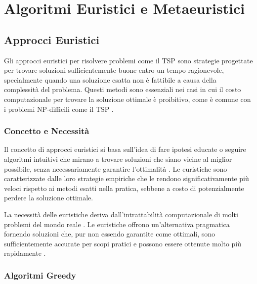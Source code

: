 
%

\chapter{Algoritmi Euristici e Metaeuristici}\label{chapt:4}
\section{Approcci Euristici}

Gli approcci euristici per risolvere problemi come il \gls{TSP} sono strategie progettate per trovare soluzioni sufficientemente buone entro un tempo ragionevole, specialmente quando una soluzione esatta non è fattibile a causa della complessità \cite{Johnson2002} del problema. Questi metodi sono essenziali nei casi in cui il costo computazionale per trovare la soluzione ottimale è proibitivo, come è comune con i problemi NP-difficili come il \gls{TSP} \cite{Cormen2009}.

\subsection{Concetto e Necessità}
Il concetto di approcci euristici si basa sull'idea di fare ipotesi educate o seguire algoritmi intuitivi che mirano a trovare soluzioni che siano vicine al miglior possibile, senza necessariamente garantire l'ottimalità \cite{Papadimitriou1998}. Le euristiche sono caratterizzate dalle loro strategie empiriche che le rendono significativamente più veloci rispetto ai metodi esatti nella pratica, sebbene a costo di potenzialmente perdere la soluzione ottimale.

La necessità delle euristiche deriva dall'intrattabilità computazionale di molti problemi del mondo reale \cite{Lawler1985}. Le euristiche offrono un'alternativa pragmatica fornendo soluzioni che, pur non essendo garantite come ottimali, sono sufficientemente accurate per scopi pratici e possono essere ottenute molto più rapidamente \cite{Aarts1989}.

\subsection{Algoritmi Greedy}

